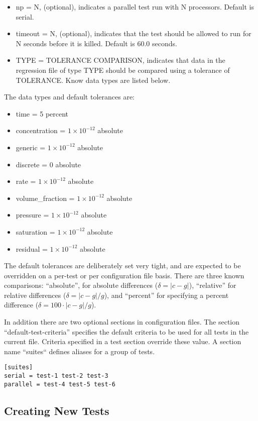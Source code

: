 \begin{itemize}
\item np = N, (optional), indicates a parallel test run with N processors. Default is serial.
\item timeout = N, (optional), indicates that the test should be allowed to run
  for N seconds before it is killed. Default is 60.0 seconds.
\item TYPE = TOLERANCE COMPARISON, indicates that data in the
  regression file of type TYPE should be compared using a tolerance of
  TOLERANCE. Know data types are listed below.
\end{itemize}

The data types and default tolerances are:
\begin{itemize}
\item time = 5 percent
\item concentration = $1\times 10^{-12}$ absolute
\item generic = $1\times 10^{-12}$ absolute
\item discrete = 0 absolute
\item rate = $1\times 10^{-12}$ absolute
\item volume\_fraction = $1\times 10^{-12}$ absolute
\item pressure = $1\times 10^{-12}$ absolute
\item saturation = $1\times 10^{-12}$ absolute
\item residual = $1\times 10^{-12}$ absolute
\end{itemize}
The default tolerances are deliberately set very tight, and are
expected to be overridden on a per-test or per configuration file
basis.  There are three known comparisons: ``absolute'', for absolute
differences ($\delta\!=\!|c\!-\!g|$), ``relative'' for relative differences ($\delta\!=\!{|c\!-\!g|}/{g}$), and ``percent''
for specifying a percent difference ($\delta\!=\!100\!\cdot\!{|c\!-\!g|}/{g}$).

In addition there are two optional sections in configuration
files. The section ``default-test-criteria'' specifies the default
criteria to be used for all tests in the current file. Criteria
specified in a test section override these value. A section name
``suites`` defines aliases for a group of tests.
\begin{verbatim}
[suites]
serial = test-1 test-2 test-3
parallel = test-4 test-5 test-6
\end{verbatim}

\subsection{Creating New Tests}

